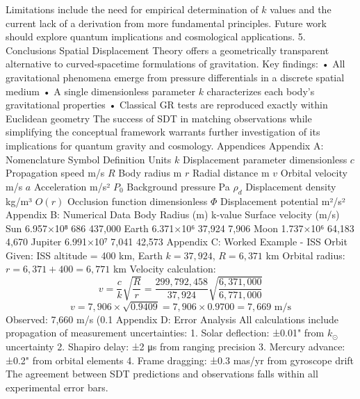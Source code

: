 Limitations include the need for empirical determination of $k$ values and the current lack of a derivation from more fundamental principles. Future work should explore quantum implications and cosmological applications.
5. Conclusions
Spatial Displacement Theory offers a geometrically transparent alternative to curved-spacetime formulations of gravitation. Key findings:
•	All gravitational phenomena emerge from pressure differentials in a discrete spatial medium
•	A single dimensionless parameter $k$ characterizes each body's gravitational properties
•	Classical GR tests are reproduced exactly within Euclidean geometry
The success of SDT in matching observations while simplifying the conceptual framework warrants further investigation of its implications for quantum gravity and cosmology.
Appendices
Appendix A: Nomenclature
Symbol	Definition	Units
$k$	Displacement parameter	dimensionless
$c$	Propagation speed	m/s
$R$	Body radius	m
$r$	Radial distance	m
$v$	Orbital velocity	m/s
$a$	Acceleration	m/s²
$P_0$	Background pressure	Pa
$\rho_d$	Displacement density	kg/m³
$O(r)$	Occlusion function	dimensionless
$\Phi$	Displacement potential	m²/s²
Appendix B: Numerical Data
Body	Radius (m)	k-value	Surface velocity (m/s)
Sun	6.957×10⁸	686	437,000
Earth	6.371×10⁶	37,924	7,906
Moon	1.737×10⁶	64,183	4,670
Jupiter	6.991×10⁷	7,041	42,573
Appendix C: Worked Example - ISS Orbit
Given: ISS altitude = 400 km, Earth $k = 37,924$, $R = 6,371$ km
Orbital radius: $r = 6,371 + 400 = 6,771$ km
Velocity calculation: $$v = \frac{c}{k}\sqrt{\frac{R}{r}} = \frac{299,792,458}{37,924}\sqrt{\frac{6,371,000}{6,771,000}}$$
$$v = 7,906 \times \sqrt{0.9409} = 7,906 \times 0.9700 = 7,669 \text{ m/s}$$
Observed: 7,660 m/s (0.1%
Appendix D: Error Analysis
All calculations include propagation of measurement uncertainties:
1.	Solar deflection: ±0.01" from $k_{\odot}$ uncertainty
2.	Shapiro delay: ±2 μs from ranging precision
3.	Mercury advance: ±0.2" from orbital elements
4.	Frame dragging: ±0.3 mas/yr from gyroscope drift
The agreement between SDT predictions and observations falls within all experimental error bars.

